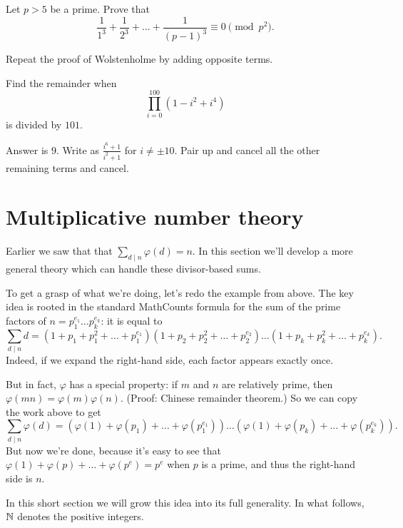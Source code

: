 \documentclass[11pt]{scrartcl}
\begin{document}
\begin{problem}
  Let $p > 5$ be a prime.
  Prove that
  \[ \frac{1}{1^3} + \frac{1}{2^3} + \dots + \frac{1}{(p-1)^3}
    \equiv 0 \pmod{p^2}. \]
  \begin{hint}
    Repeat the proof of Wolstenholme by adding opposite terms.
  \end{hint}
\end{problem}

\begin{problem}
  Find the remainder when
  \[ \prod_{i=0}^{100} (1-i^2+i^4) \]
  is divided by $101$.
  \begin{hint}
    Answer is $9$.
    Write as $\frac{i^6+1}{i^2+1}$ for $i \neq \pm 10$.
    Pair up and cancel all the other remaining terms and cancel.
  \end{hint}
\end{problem}

\section{Multiplicative number theory}
Earlier we saw that that $\sum_{d \mid n} \varphi(d) = n$.
In this section we'll develop a more general theory
which can handle these divisor-based sums.

To get a grasp of what we're doing, let's redo the example from above.
The key idea is rooted in the standard MathCounts formula for
the sum of the prime factors of $n = p_1^{e_1} \dots p_k^{e_k}$:
it is equal to
\[
  \sum_{d \mid n} d
  = \left( 1 + p_1 + p_1^2 + \dots + p_1^{e_1} \right)
  \left( 1 + p_2 + p_2^2 + \dots + p_2^{e_2} \right)
  \dots
  \left( 1 + p_k + p_k^2 + \dots + p_k^{e_k} \right).
\]
Indeed, if we expand the right-hand side, each factor appears exactly once.

But in fact, $\varphi$ has a special property:
if $m$ and $n$ are relatively prime,
then $\varphi(mn) = \varphi(m)\varphi(n)$.
(Proof: Chinese remainder theorem.)
So we can copy the work above to get
\[
  \sum_{d \mid n} \varphi(d)
  = \left( \varphi(1) + \varphi(p_1) + \dots + \varphi(p_1^{e_1}) \right)
  \dots
  \left( \varphi(1) + \varphi(p_k) + \dots + \varphi(p_k^{e_k}) \right).
\]
But now we're done,
because it's easy to see that $\varphi(1) + \varphi(p) + \dots + \varphi(p^e) = p^e$
when $p$ is a prime, and thus the right-hand side is $n$.

In this short section we will grow this idea into its full generality.
In what follows, $\mathbb N$ denotes the positive integers.
\end{document}
